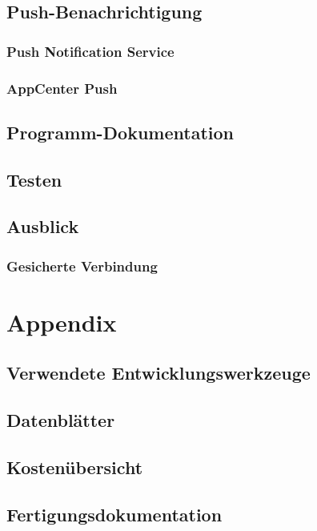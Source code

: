\documentclass[a4paper, 12pt, twoside, openright
]{memoir}
\newcommand{\AndreasGrain}{Andreas Grain}
\newcommand{\MatthiasMair}{Matthias Mair}
\newcommand{\authorName}{\AndreasGrain / \MatthiasMair}
\begin{document}
\chapter{Push-Benachrichtigung}
\label{ch:push}
\section{Push Notification Service}
\section{AppCenter Push}
\chapter{Programm-Dokumentation}

\chapter{Testen}
\chapter{Ausblick}
\section{Gesicherte Verbindung}%
\cleartoverso

\renewcommand{\authorName}{\AndreasGrain / \MatthiasMair}
\appendix
\printbibliography\clearpage
\printacronyms[heading=chapter*,name=Abkürzungen]\clearpage
\listoffigures\clearpage
\listoftables\clearpage

\part{Appendix}
\chapter{Verwendete Entwicklungswerkzeuge}
\chapter{Datenblätter}
\chapter{Kostenübersicht}
\chapter{Fertigungsdokumentation}
\end{document}
